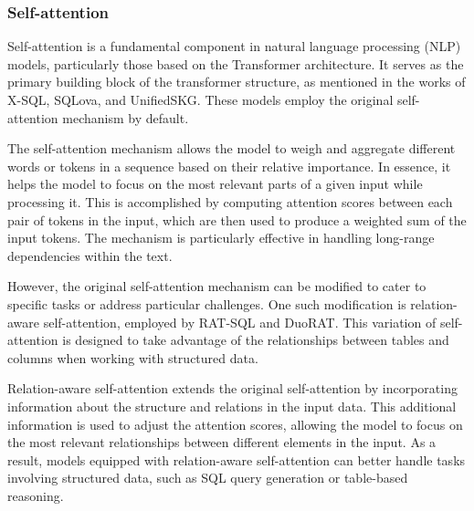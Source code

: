 \subsubsection{Self-attention}
\label{sec:methods:encoders:SelfAttention}

Self-attention is a fundamental component in natural language processing (NLP) models, particularly those based on the Transformer architecture. It serves as the primary building block of the transformer structure, as mentioned in the works of X-SQL\cite{he2019xsql}, SQLova\cite{DBLP:journals/corr/abs-1902-01069}, and UnifiedSKG\cite{xie2022unifiedskg}. These models employ the original self-attention mechanism by default.

The self-attention mechanism allows the model to weigh and aggregate different words or tokens in a sequence based on their relative importance\cite{https://doi.org/10.48550/arxiv.1706.03762}. In essence, it helps the model to focus on the most relevant parts of a given input while processing it. This is accomplished by computing attention scores between each pair of tokens in the input, which are then used to produce a weighted sum of the input tokens. The mechanism is particularly effective in handling long-range dependencies within the text.

However, the original self-attention mechanism can be modified to cater to specific tasks or address particular challenges. One such modification is relation-aware self-attention, employed by RAT-SQL\cite{wang_rat_sql_2021} and DuoRAT\cite{scholak-etal-2021-duorat}. This variation of self-attention is designed to take advantage of the relationships between tables and columns when working with structured data.

Relation-aware self-attention extends the original self-attention by incorporating information about the structure and relations in the input data. This additional information is used to adjust the attention scores, allowing the model to focus on the most relevant relationships between different elements in the input. As a result, models equipped with relation-aware self-attention can better handle tasks involving structured data, such as SQL query generation or table-based reasoning.

